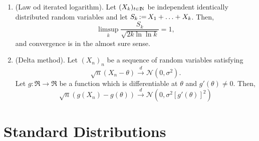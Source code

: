 \documentclass[a4paper,10pt]{scrbook}
\begin{document}
\begin{enumerate}
 \item (Law od iterated logarithm). Let \((X_k)_{t\in\N}\) be independent identically 
       distributed random variables and let \(S_k{}{}\mathop{\mathrel{:}=}{}{} X_1 + \ldots + X_k\). Then,
       \[
        \limsup_{k}\frac{S_k}{\sqrt{2k\ln \ln k}} = 1,
       \]
       and convergence is in the almost sure sense.

 \item (Delta method). Let \((X_n)_n\) be a sequence of random variables satisfying
 \[
  \sqrt{n}(X_n - \theta) \overset{d}{\to} \mathcal{N}(0,\sigma^2).
 \]
 Let \(g:\Re\to\Re\) be a function which is differentiable at \(\theta\) and \(g'(\theta)\neq 0\).
 Then,
 \[
  \sqrt{n} (g(X_n) - g(\theta)) \overset{d}{\to} \mathcal{N}(0, \sigma^2[g'(\theta)]^2)
 \]

 

\end{enumerate}



\section{Standard Distributions}
\end{document}
